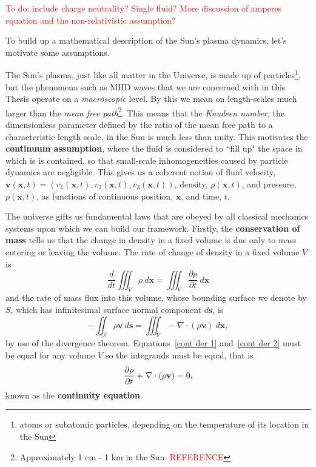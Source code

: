 \documentclass[12pt]{../style-files/ociamthesis}
\begin{document}
\textcolor{red}{To do: include charge neutrality? Single fluid? More discussion of amperes equation and the non-relativistic assumption?}

To build up a mathematical description of the Sun's plasma dynamics, let's motivate some assumptions.

The Sun's plasma, just like all matter in the Universe, is made up of particles\footnote{atoms or subatomic particles, depending on the temperature of its location in the Sun}, but the phenomena such as MHD waves that we are concerned with in this Thesis operate on a \textit{macroscopic} level. By this we mean on length-scales much larger than the \textit{mean free path}\footnote{Approximately 1 cm - 1 km in the Sun. \textcolor{red}{REFERENCE}}. This means that the \textit{Knudsen number}, the dimensionless parameter defined by the ratio of the mean free path to a characteristic length scale, in the Sun is much less than unity. This motivates the \textbf{continuum assumption}, where the fluid is considered to ``fill up" the space in which is is contained, so that small-scale inhomogeneities caused by particle dynamics are negligible. This gives us a coherent notion of fluid velocity, $\mathbf{v}(\mathbf{x}, t) = (v_1(\mathbf{x}, t), v_2(\mathbf{x}, t), v_3(\mathbf{x}, t))$, density, $\rho(\mathbf{x}, t)$, and pressure, $p(\mathbf{x}, t)$, as functions of continuous position, $\mathbf{x}$, and time, $t$.

The universe gifts us fundamental laws that are obeyed by all classical mechanics systems upon which we can build our framework. Firstly, the \textbf{conservation of mass} tells us that the change in density in a fixed volume is due only to mass entering or leaving the volume. The rate of change of density in a fixed volume $V$ is
\begin{equation}
	\frac{d}{dt} \iiint_V \rho ~d\mathbf{x} = \iiint_V \frac{\partial\rho}{\partial t} ~d\mathbf{x} \label{cont der 1}
\end{equation}
and the rate of mass flux into this volume, whose bounding surface we denote by $S$, which has infinitesimal surface normal component $d\mathbf{s}$, is
\begin{equation}
	-\iint_S \rho \mathbf{v} ~d\mathbf{s} = \iiint_V -\nabla\cdot(\rho\mathbf{v}) ~d\mathbf{x}, \label{cont der 2}
\end{equation}
by use of the divergence theorem. Equations~\eqref{cont der 1} and~\eqref{cont der 2} must be equal for any volume $V$ so the integrands must be equal, that is
\begin{equation}
	\frac{\partial\rho}{\partial t} + \nabla\cdot(\rho \mathbf{v}) = 0, \label{cont eqn}
\end{equation}
known as the \textbf{continuity equation}.
\end{document}
